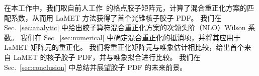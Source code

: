 在本工作中，我们取自前人工作~\cite{Good:2024iur}的格点胶子矩阵元，计算了混合重正化方案的匹配系数，从而用 LaMET 方法获得了首个光锥核子胶子 PDF。
我们在 Sec.~\ref{sec:analytic} 中给出胶子算符混合重正化方案的次领头阶（NLO）Wilson 系数。
我们在 Sec.~\ref{sec:numerical} 中确定混合重正化的抵消项，并将其应用于 LaMET 矩阵元的重正化。
我们将重正化矩阵元与唯象估计相比较，给出首个来自 LaMET 的核子胶子 PDF，并与唯象拟合进行比较。
我们在 Sec.~\ref{sec:conclusion} 中总结并展望胶子 PDF 的未来前景。
